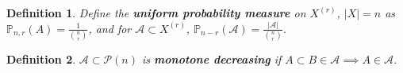 \documentclass[a4paper]{article}
\newtheorem*{definition}{Definition}
\newcommand*\abs[1]{\left|#1\right|}
\begin{document}
\begin{definition}
	Define the \textbf{uniform probability measure} on $X^{(r)}$, $\abs{X}=n$ as $\mathbb{P}_{n,r}(A) = \frac{1}{{n \choose r}}$, and for $\mathcal{A} \subset X^{(r)}$, $\mathbb{P}_{n-r}(\mathcal{A}) = \frac{\abs{\mathcal{A}}}{{n \choose r}}$.
\end{definition}

\begin{definition}
	$\mathcal{A} \subset \mathcal{P}(n)$ is \textbf{monotone decreasing} if $A \subset B \in \mathcal{A} \implies A \in \mathcal{A}$.
\end{definition}
\end{document}

